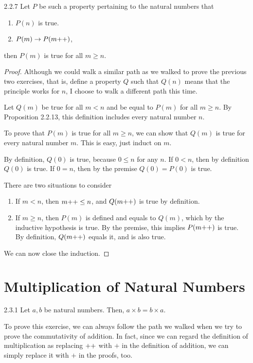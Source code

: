 \begin{exercise}{2.2.7}
		Let $P$ be such a property pertaining to the natural numbers that
		\begin{enumerate}
			\item $P(n)$ is true.
			\item $P(m) \to P(m{+}{+})$,
		\end{enumerate}
		then $P(m)$ is true for all $m \ge n$.
\end{exercise}
\begin{proof}
	Although we could walk a similar path as we walked to prove the previous two exercises, that is, define a property $Q$ such that $Q(n)$ means that the principle works for $n$, I choose to walk a different path this time.

	Let $Q(m)$ be true for all $m < n$ and be equal to $P(m)$ for all $m \ge n$. By Proposition 2.2.13, this definition includes every natural number $n$.
	
	To prove that $P(m)$ is true for all $m \ge n$, we can show that $Q(m)$ is true for every natural number $m$. This is easy, just induct on $m$.
	
	By definition, $Q(0)$ is true, because $0 \le n$ for any $n$. If $0 < n$, then by definition $Q(0)$ is true. If $0 = n$, then by the premise $Q(0) = P(0)$ is true.

	There are two situations to consider
\begin{enumerate}
	\item If $m < n$, then $m{+}{+} \le n$, and $Q(m{+}{+})$ is true by definition.
	\item If $m \ge n$, then $P(m)$ is defined and equals to $Q(m)$, which by the inductive hypothesis is true. By the premise, this implies $P(m{+}{+})$ is true. By definition, $Q(m{+}{+})$ equals it, and is also true.
\end{enumerate}

We can now close the induction.
\end{proof}

\section{Multiplication of Natural Numbers}
\begin{exercise}{2.3.1}
	Let $a,b$ be natural numbers. Then, $a \times b = b \times a$.
\end{exercise}
To prove this exercise, we can always follow the path we walked when we try to prove the commutativity of addition. In fact, since we can regard the definition of multiplication as replacing ${+}{+}$ with $+$ in the definition of addition, we can simply replace it with $+$ in the proofs, too.

